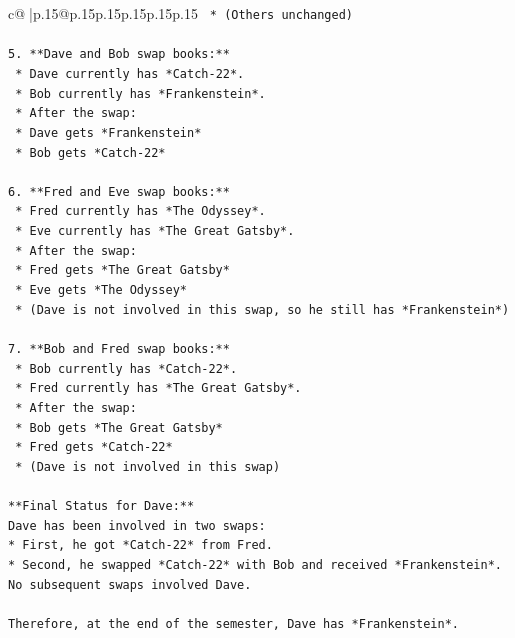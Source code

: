 \documentclass{article}
\begin{document}
{\begin{supertabular}{c@{$\;$}|p{.15\linewidth}@{}p{.15\linewidth}p{.15\linewidth}p{.15\linewidth}p{.15\linewidth}p{.15\linewidth}}
{{{\texttt{    *   (Others unchanged)} \\
\\ 
\texttt{5.  **Dave and Bob swap books:**} \\
\texttt{    *   Dave currently has *Catch{-}22*.} \\
\texttt{    *   Bob currently has *Frankenstein*.} \\
\texttt{    *   After the swap:} \\
\texttt{        *   Dave gets *Frankenstein*} \\
\texttt{        *   Bob gets *Catch{-}22*} \\
\\ 
\texttt{6.  **Fred and Eve swap books:**} \\
\texttt{    *   Fred currently has *The Odyssey*.} \\
\texttt{    *   Eve currently has *The Great Gatsby*.} \\
\texttt{    *   After the swap:} \\
\texttt{        *   Fred gets *The Great Gatsby*} \\
\texttt{        *   Eve gets *The Odyssey*} \\
\texttt{    *   (Dave is not involved in this swap, so he still has *Frankenstein*)} \\
\\ 
\texttt{7.  **Bob and Fred swap books:**} \\
\texttt{    *   Bob currently has *Catch{-}22*.} \\
\texttt{    *   Fred currently has *The Great Gatsby*.} \\
\texttt{    *   After the swap:} \\
\texttt{        *   Bob gets *The Great Gatsby*} \\
\texttt{        *   Fred gets *Catch{-}22*} \\
\texttt{    *   (Dave is not involved in this swap)} \\
\\ 
\texttt{**Final Status for Dave:**} \\
\texttt{Dave has been involved in two swaps:} \\
\texttt{*   First, he got *Catch{-}22* from Fred.} \\
\texttt{*   Second, he swapped *Catch{-}22* with Bob and received *Frankenstein*.} \\
\texttt{No subsequent swaps involved Dave.} \\
\\ 
\texttt{Therefore, at the end of the semester, Dave has *Frankenstein*.} \\
}}}
\end{supertabular}}
\end{document}

